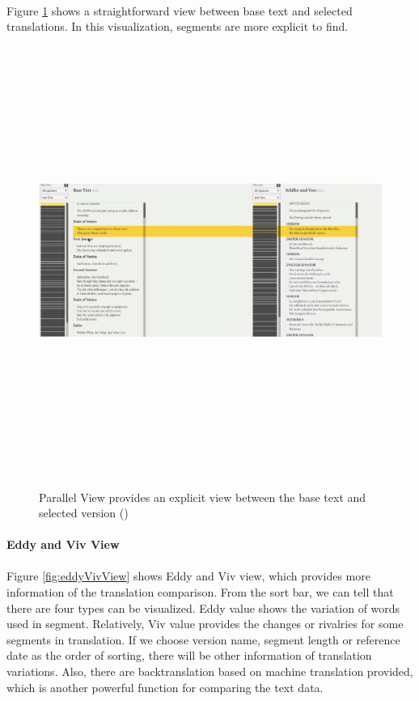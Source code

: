 \paragraph[]{}

Figure \ref{fig:parallelView} shows a straightforward view between base text and selected translations. In this visualization, segments are more explicit to find.

\begin{figure}[h] 
	\centering	
	\includegraphics[width=16cm, height=14cm]{Figs/Parallel-View}\\[1ex]
	\caption{Parallel View provides an explicit view between the base text and selected version (\cite{Cheesman2012})}
	\label{fig:parallelView}
\end{figure} 

\paragraph{Eddy and Viv View}
\paragraph[]{}

Figure \ref{fig:eddyVivView} shows Eddy and Viv view, which provides more information of the translation comparison. From the sort bar, we can tell that there are four types can be visualized. Eddy value shows the variation of words used in segment. Relatively, Viv value provides the changes or rivalries for some segments in translation. If we choose version name, segment length or reference date as the order of sorting, there will be other information of translation variations. Also, there are backtranslation based on machine translation provided, which is another powerful function for comparing the text data.

